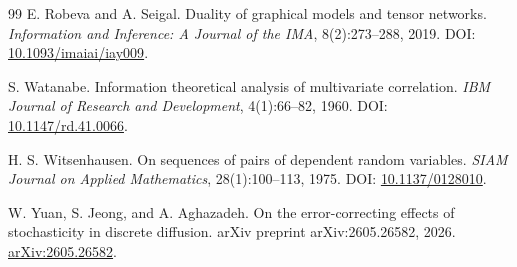 \documentclass[a4paper,11pt]{article}
\theoremstyle{definition}
\newcommand{\1}{\mathbf 1}
\begin{document}
\begin{thebibliography}{99}
E. Robeva and A. Seigal.
\newblock Duality of graphical models and tensor networks.
\newblock \emph{Information and Inference: A Journal of the IMA},
8(2):273--288, 2019.
\newblock DOI: \href{https://doi.org/10.1093/imaiai/iay009}
{10.1093/imaiai/iay009}.

S. Watanabe.
\newblock Information theoretical analysis of multivariate correlation.
\newblock \emph{IBM Journal of Research and Development}, 4(1):66--82, 1960.
\newblock DOI: \href{https://doi.org/10.1147/rd.41.0066}{10.1147/rd.41.0066}.

H. S. Witsenhausen.
\newblock On sequences of pairs of dependent random variables.
\newblock \emph{SIAM Journal on Applied Mathematics}, 28(1):100--113, 1975.
\newblock DOI: \href{https://doi.org/10.1137/0128010}{10.1137/0128010}.

W. Yuan, S. Jeong, and A. Aghazadeh.
\newblock On the error-correcting effects of stochasticity in discrete
diffusion.
\newblock arXiv preprint arXiv:2605.26582, 2026.
\newblock \href{https://arxiv.org/abs/2605.26582}{arXiv:2605.26582}.

\end{thebibliography}
\end{document}

